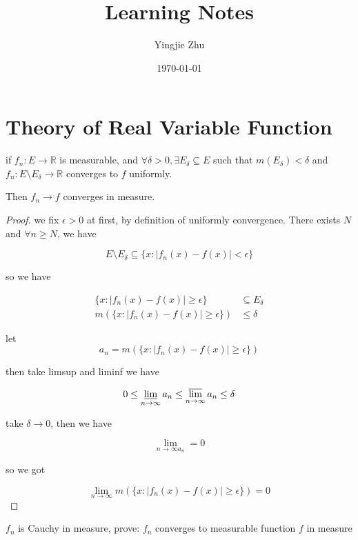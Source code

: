 \documentclass[11pt,a4paper]{article}
\title{Learning Notes}
\author{Yingjie Zhu}
\date{\today}
\begin{document}
\maketitle

\section{Theory of Real Variable Function}

\begin{exercise}
    if $f_n: E \to \mathbb{R}$ is measurable, and $\forall \delta > 0, \exists E_{\delta} \subseteq E$ such that
    $m(E_{\delta}) < \delta$ and $f_n: E \setminus E_{\delta} \to \mathbb{R}$ converges to $f$ uniformly.

    Then $f_n \to f$ converges in measure.
\end{exercise}

\begin{proof}
    we fix $\epsilon > 0$ at first, by definition of uniformly convergence. There exists $N$ and $\forall n \ge N$, we have

    \[
        E \setminus E_{\delta} \subseteq \{ x : \lvert f_n(x) - f(x) \rvert < \epsilon \}
    \]

    so we have


    \begin{align*}
        \{ x : \lvert f_n(x) - f(x) \rvert \ge \epsilon \} & \subseteq E_{\delta} \\
        m(\{ x : \lvert f_n(x) - f(x) \rvert \ge \epsilon \}) & \le \delta
    \end{align*}

    let 
    \[
        a_n = m(\{ x : \lvert f_n(x) - f(x) \rvert \ge \epsilon \})
    \]

    then take limsup and liminf we have

    \[
       0 \le \varliminf_{n \to \infty}a_n \le \varlimsup_{n \to \infty}a_n \le \delta
    \]

    take $\delta \to 0$, then we have

    \[
        \lim_{n \to \infty a_n} = 0
    \]

    so we got

    \[
        \lim_{n \to \infty} m(\{ x : \lvert f_n(x) - f(x) \rvert \ge \epsilon \}) = 0
    \]
\end{proof}

\begin{exercise}
    $f_n$ is Cauchy in measure, prove: $f_n$ converges to measurable function $f$ in measure
\end{exercise}
\end{document}
